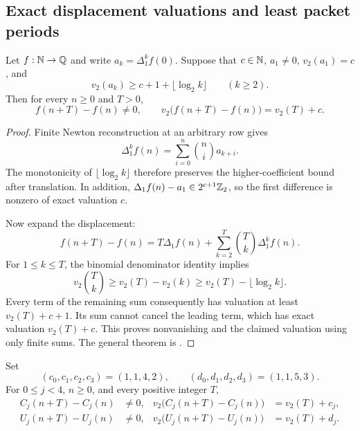 \subsection{Exact displacement valuations and least packet periods}

\begin{lemma}\label{lem:arith-dominance}
Let $f:\mathbb N\to\mathbb Q$ and write $a_k=\Delta_1^kf(0)$.  Suppose that $c\in\mathbb N$,
$a_1\ne0$, $v_2(a_1)=c$, and
\[
 v_2(a_k)\ge c+1+\lfloor\log_2k\rfloor\qquad(k\ge2).
\]
Then for every $n\ge0$ and $T>0$,
\[
 f(n+T)-f(n)\ne0,\qquad
 v_2\bigl(f(n+T)-f(n)\bigr)=v_2(T)+c.
\]
\end{lemma}

\begin{proof}
Finite Newton reconstruction at an arbitrary row gives
\[
 \Delta_1^kf(n)=\sum_{i=0}^{n}\binom ni a_{k+i}.
\]
The monotonicity of $\lfloor\log_2k\rfloor$ therefore preserves the
higher-coefficient bound after translation.  In addition,
$\Delta_1f(n)-a_1\in2^{c+1}\mathbb Z_2$, so the first difference is nonzero
of exact valuation $c$.

Now expand the displacement:
\[
 f(n+T)-f(n)=T\Delta_1f(n)
          +\sum_{k=2}^{T}\binom Tk\Delta_1^kf(n).
\]
For $1\le k\le T$, the binomial denominator identity implies
\[
 v_2\binom Tk\ge v_2(T)-v_2(k)
            \ge v_2(T)-\lfloor\log_2k\rfloor.
\]
Every term of the remaining sum consequently has valuation at least
$v_2(T)+c+1$.  Its sum cannot cancel the leading term, which has exact
valuation $v_2(T)+c$.  This proves nonvanishing and the claimed valuation
using only finite sums.
The general theorem is
.
\end{proof}

\begin{theorem}\label{thm:arith-exact}
Set
\[
 (c_0,c_1,c_2,c_3)=(1,1,4,2),\qquad
 (d_0,d_1,d_2,d_3)=(1,1,5,3).
\]
For $0\le j<4$, $n\ge0$, and every positive integer $T$,
\begin{align*}
 C_j(n+T)-C_j(n)&\ne0,&
 v_2\bigl(C_j(n+T)-C_j(n)\bigr)&=v_2(T)+c_j,\\
 U_j(n+T)-U_j(n)&\ne0,&
 v_2\bigl(U_j(n+T)-U_j(n)\bigr)&=v_2(T)+d_j.
\end{align*}
\end{theorem}

